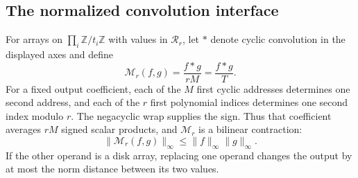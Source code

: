 \documentclass[11pt]{article}
\theoremstyle{definition}
\begin{document}
\subsection{The normalized convolution interface}

For arrays on $\prod_i\mathbb Z/t_i\mathbb Z$ with values in
$\mathcal R_r$, let $*$ denote cyclic convolution in the displayed
axes and define
\[
       \mathcal M_r(f,g)=\frac{f*g}{rM}=\frac{f*g}{T}.
\]
For a fixed output coefficient, each of the $M$ first cyclic
addresses determines one second address, and each of the $r$ first
polynomial indices determines one second index modulo $r$.  The
negacyclic wrap supplies the sign.  Thus that coefficient averages
$rM$ signed scalar products, and $\mathcal M_r$ is a bilinear
contraction:
\[
 \|\mathcal M_r(f,g)\|_\infty
       \leq\|f\|_\infty\|g\|_\infty.
\]
If the other operand is a disk array, replacing one operand changes
the output by at most the norm distance between its two values.
\end{document}
